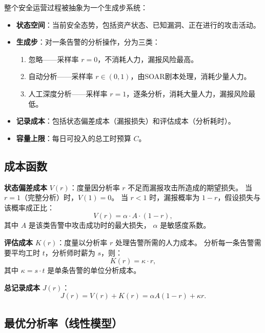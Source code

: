 \documentclass[11pt,a4paper]{article}
\begin{document}
整个安全运营过程被抽象为一个生成步系统：
\begin{itemize}
    \item \textbf{状态空间}：当前安全态势，包括资产状态、已知漏洞、正在进行的攻击活动。
    \item \textbf{生成步}：对一条告警的分析操作，分为三类：
    \begin{enumerate}[label=(\arabic*)]
        \item 忽略——采样率 $r = 0$，不消耗人力，漏报风险最高。
        \item 自动分析——采样率 $r \in (0,1)$，由SOAR剧本处理，消耗少量人力。
        \item 人工深度分析——采样率 $r = 1$，逐条分析，消耗大量人力，漏报风险最低。
    \end{enumerate}
    \item \textbf{记录成本}：包括状态偏差成本（漏报损失）和评估成本（分析耗时）。
    \item \textbf{容量上限}：每日可投入的总工时预算 $C$。
\end{itemize}

\subsection{成本函数}

\textbf{状态偏差成本} $V(r)$：度量因分析率 $r$ 不足而漏报攻击所造成的期望损失。
当 $r = 1$（完整分析）时，$V(1) = 0$。
当 $r < 1$ 时，漏报概率为 $1-r$，假设损失与该概率成正比：
\begin{equation}\label{eq:V}
V(r) = \alpha \cdot A \cdot (1 - r),
\end{equation}
其中 $A$ 是该类告警中攻击成功时的最大损失，
$\alpha$ 是敏感度系数。

\textbf{评估成本} $K(r)$：度量以分析率 $r$ 处理告警所需的人力成本。
分析每一条告警需要平均工时 $t$，分析师时薪为 $s$，则：
\begin{equation}\label{eq:K}
K(r) = \kappa \cdot r,
\end{equation}
其中 $\kappa = s \cdot t$ 是单条告警的单位分析成本。

\textbf{总记录成本} $J(r)$：
\begin{equation}\label{eq:J}
J(r) = V(r) + K(r) = \alpha A (1 - r) + \kappa r.
\end{equation}

\subsection{最优分析率（线性模型）}
\end{document}

